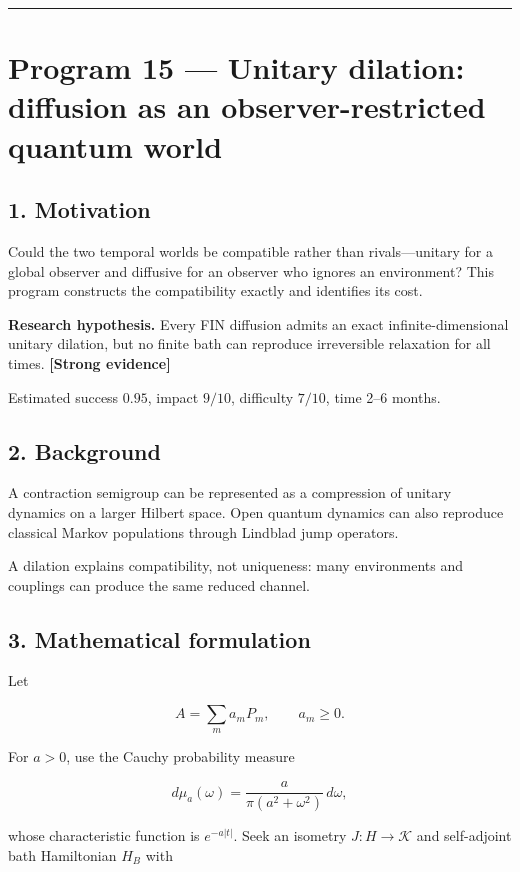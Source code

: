 \documentclass[11pt,a4paper,openany]{report}
\newcommand{\statusStrong}{\textcolor{finblue}{[Strong evidence]}}
\begin{document}
\par\medskip\hrule\medskip

\chapter{Program 15 — Unitary dilation: diffusion as an observer-restricted quantum world}

\section{1. Motivation}

Could the two temporal worlds be compatible rather than rivals—unitary for a global observer and diffusive for an observer who ignores an environment? This program constructs the compatibility exactly and identifies its cost.

\textbf{Research hypothesis.} Every FIN diffusion admits an exact infinite-dimensional unitary dilation, but no finite bath can reproduce irreversible relaxation for all times. \textbf{\statusStrong{}}

Estimated success \(0.95\), impact \(9/10\), difficulty \(7/10\), time 2–6 months.

\section{2. Background}

A contraction semigroup can be represented as a compression of unitary dynamics on a larger Hilbert space. Open quantum dynamics can also reproduce classical Markov populations through Lindblad jump operators.

A dilation explains compatibility, not uniqueness: many environments and couplings can produce the same reduced channel.

\section{3. Mathematical formulation}

Let

\[
A=\sum_m a_mP_m,\qquad a_m\ge0.
\]

For \(a>0\), use the Cauchy probability measure

\[
d\mu_a(\omega)
=\frac{a}{\pi(a^2+\omega^2)}\,d\omega,
\]

whose characteristic function is \(e^{-a|t|}\). Seek an isometry \(J:H\to\mathcal K\) and self-adjoint bath Hamiltonian \(H_B\) with
\end{document}
